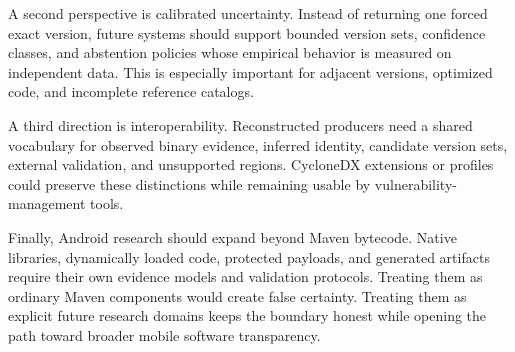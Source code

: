 A second perspective is calibrated uncertainty. Instead of returning one
forced exact version, future systems should support bounded version sets,
confidence classes, and abstention policies whose empirical behavior is
measured on independent data. This is especially important for adjacent
versions, optimized code, and incomplete reference catalogs.

A third direction is interoperability. Reconstructed \SBOM producers need a
shared vocabulary for observed binary evidence, inferred identity, candidate
version sets, external validation, and unsupported regions. CycloneDX
extensions or profiles could preserve these distinctions while remaining
usable by vulnerability-management tools.

Finally, Android research should expand beyond Maven bytecode. Native
libraries, dynamically loaded code, protected payloads, and generated
artifacts require their own evidence models and validation protocols. Treating
them as ordinary Maven components would create false certainty. Treating them
as explicit future research domains keeps the boundary honest while opening
the path toward broader mobile software transparency.
